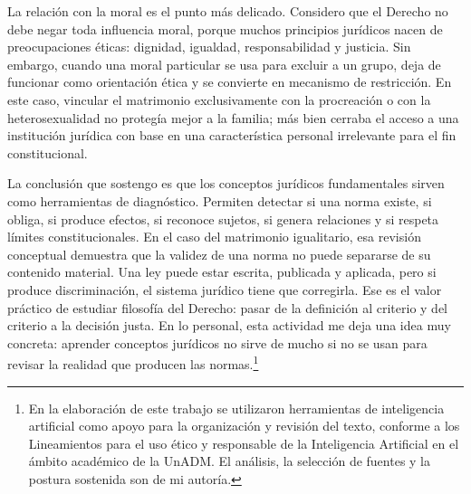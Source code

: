 \documentclass[
	spanish,
	letterpaper, oneside
]{article}
\begin{document}
La relación con la moral es el punto más delicado. Considero que el Derecho no debe negar toda influencia moral, porque muchos principios jurídicos nacen de preocupaciones éticas: dignidad, igualdad, responsabilidad y justicia. Sin embargo, cuando una moral particular se usa para excluir a un grupo, deja de funcionar como orientación ética y se convierte en mecanismo de restricción. En este caso, vincular el matrimonio exclusivamente con la procreación o con la heterosexualidad no protegía mejor a la familia; más bien cerraba el acceso a una institución jurídica con base en una característica personal irrelevante para el fin constitucional.

La conclusión que sostengo es que los conceptos jurídicos fundamentales sirven como herramientas de diagnóstico. Permiten detectar si una norma existe, si obliga, si produce efectos, si reconoce sujetos, si genera relaciones y si respeta límites constitucionales. En el caso del matrimonio igualitario, esa revisión conceptual demuestra que la validez de una norma no puede separarse de su contenido material. Una ley puede estar escrita, publicada y aplicada, pero si produce discriminación, el sistema jurídico tiene que corregirla. Ese es el valor práctico de estudiar filosofía del Derecho: pasar de la definición al criterio y del criterio a la decisión justa. En lo personal, esta actividad me deja una idea muy concreta: aprender conceptos jurídicos no sirve de mucho si no se usan para revisar la realidad que producen las normas.\footnote{En la elaboración de este trabajo se utilizaron herramientas de inteligencia artificial como apoyo para la organización y revisión del texto, conforme a los Lineamientos para el uso ético y responsable de la Inteligencia Artificial en el ámbito académico de la UnADM. El análisis, la selección de fuentes y la postura sostenida son de mi autoría.}



\end{document}

